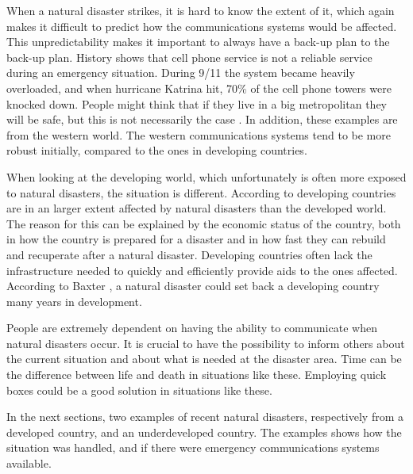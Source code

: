 When a natural disaster strikes, it is hard to know the extent of it, which  again makes it difficult to predict how the communications systems would be affected. This unpredictability makes it important to always have a back-up plan to the back-up plan. History shows that cell phone service is not a reliable service during an emergency situation. During 9/11 the system became heavily overloaded, and when hurricane Katrina hit, 70\% of the cell phone towers were knocked down. People might think that if they live in a big metropolitan they will be safe, but this is not necessarily the case \cite{disasterComm}. In addition, these examples are from the western world. The western communications systems tend to be more robust initially, compared to the ones in developing countries. 

When looking at the developing world, which unfortunately is often more exposed to natural disasters, the situation is different. According to \cite{DevelopingWorld, 360} developing countries are in an larger extent affected by natural disasters than the developed world. The reason for this can be explained by the economic status of the country, both in how the country is prepared for a disaster and in how fast they can rebuild and recuperate after a natural disaster. Developing countries often lack the infrastructure needed to quickly and efficiently provide aids to the ones affected. According to Baxter \cite{360}, a natural disaster could set back a developing country many years in development.  

People are extremely dependent on having the ability to communicate when natural disasters occur. It is crucial to have the possibility to inform others about the current situation and about what is needed at the disaster area. Time can be the difference between life and death in situations like these. Employing \gls{quick} boxes could be a good solution in situations like these. 

In the next sections, two examples of recent natural disasters, respectively from a developed country, and an underdeveloped country. The examples shows how the situation was handled, and if there were emergency communications systems available. 

